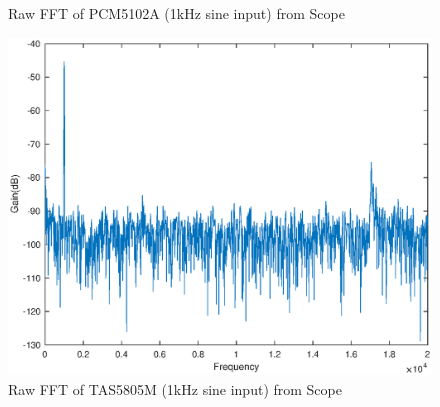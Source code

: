 \documentclass[main.tex]{subfiles}
\begin{document}
\begin{figure}[H]
    \caption{Raw FFT of PCM5102A (1kHz sine input) from Scope}
    \label{fig:dac-thd}
\end{figure}

\begin{figure}[H]
    \centering
    \includegraphics[scale=0.75]{./figs/TI_THD.eps}        
    \caption{Raw FFT of TAS5805M (1kHz sine input) from Scope}
    \label{fig:ti-thd}
\end{figure}
\end{document}

